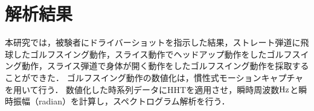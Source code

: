 \chapter{解析結果}
本研究では，被験者にドライバーショットを指示した結果，ストレート弾道に飛球したゴルフスイング動作，スライス動作でヘッドアップ動作をしたゴルフスイング動作，スライス弾道で身体が開く動作をしたゴルフスイング動作を採取することができた．
ゴルフスイング動作の数値化は，慣性式モーションキャプチャを用いて行う．
数値化した時系列データにHHTを適用させ，瞬時周波数$\rm{Hz}$と瞬時振幅（radian）を計算し，スペクトログラム解析を行う．


